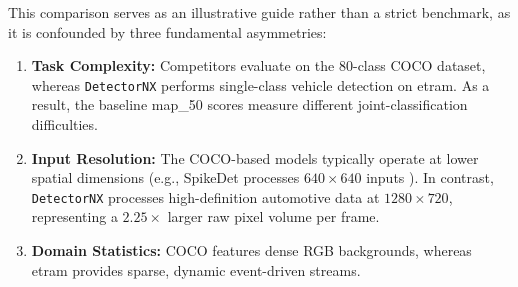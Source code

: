 This comparison serves as an illustrative guide rather than a strict benchmark, as it is confounded by three fundamental asymmetries:
\begin{enumerate}
    \item \textbf{Task Complexity:} 
    Competitors evaluate on the 80-class COCO dataset, whereas \texttt{DetectorNX} performs single-class vehicle detection on \gls{etram}. 
    As a result, the baseline \gls{map_50} scores measure different joint-classification difficulties.
    \item \textbf{Input Resolution:} The COCO-based models typically operate at lower spatial dimensions (e.g., SpikeDet processes $640 \times 640$ inputs \cite{fan2025spikedet}). In contrast, \texttt{DetectorNX} processes high-definition automotive data at $1280 \times 720$, representing a $2.25\times$ larger raw pixel volume per frame.
    \item \textbf{Domain Statistics:} 
    COCO features dense RGB backgrounds, whereas \gls{etram} provides sparse, dynamic event-driven streams.
\end{enumerate}

